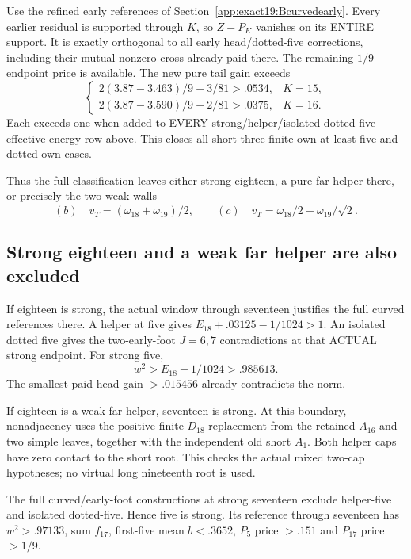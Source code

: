 \documentclass[11pt]{article}
\theoremstyle{definition}
\theoremstyle{remark}
\begin{document}
Use the refined early references
of Section~\ref{app:exact19:Bcurvedearly}.
Every earlier residual is supported
through \(K\), so \(Z-P_K\)
vanishes on its ENTIRE support.
It is exactly orthogonal to all
early head/dotted-five corrections,
including their mutual nonzero
cross already paid there.
The remaining \(1/9\) endpoint
price is available.
The new pure tail gain exceeds
\[
 \begin{cases}
 2(3.87-3.463)/9-3/81>.0534,&K=15,\\
 2(3.87-3.590)/9-2/81>.0375,&K=16 .
 \end{cases}
\]
Each exceeds one when added to
EVERY strong/helper/isolated-dotted
five effective-energy row above.
This closes all short-three
finite-own-at-least-five and
dotted-own cases.

Thus the full classification
leaves either strong eighteen,
a pure far helper there, or
precisely the two weak walls
\[
       (b)\quad v_T=(\omega_{18}+\omega_{19})/2,\qquad
       (c)\quad v_T=\omega_{18}/2+\omega_{19}/\sqrt2 .
\tag{B19survivors}\label{app:exact19:eq:Bsurvivors}
\]

\subsection{Strong eighteen and a weak far helper are also excluded}
\label{app:exact19:Bendstates}

If eighteen is strong, the actual
window through seventeen justifies
the full curved references there.
A helper at five gives
\(E_{18}+.03125-1/1024>1\).
An isolated dotted five gives
the two-early-foot \(J=6,7\)
contradictions at that ACTUAL
strong endpoint.
For strong five,
\[
                      w^2>E_{18}-1/1024>.985613 .
\]
The smallest paid head gain
\(>.015456\) already contradicts
the norm.

If eighteen is a weak far helper,
seventeen is strong.
At this boundary, nonadjacency
uses the positive finite
\(D_{18}\) replacement from
the retained \(A_{16}\) and two
simple leaves, together with the
independent old short \(A_1\).
Both helper caps have zero
contact to the short root.
This checks the actual mixed
two-cap hypotheses; no virtual
long nineteenth root is used.

The full curved/early-foot
constructions at strong seventeen
exclude helper-five and isolated
dotted-five.
Hence five is strong.
Its reference through seventeen
has
\(w^2>.97133\), sum \(f_{17}\),
first-five mean \(b<.3652\),
\(P_5\) price \(>.151\) and
\(P_{17}\) price \(>1/9\).
\end{document}
